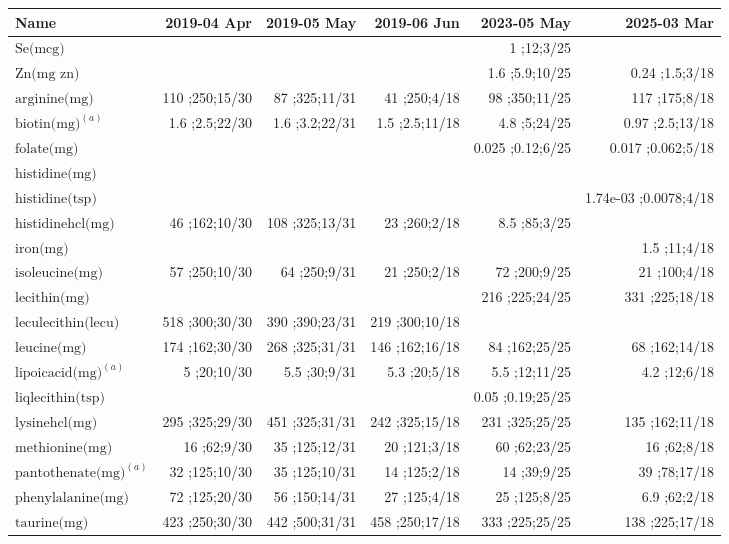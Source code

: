\begin{table}[H]
\centering
\begin{tabular}{|l|r|r|r|r|r|}
\hline
Name&2019-04 Apr&2019-05 May&2019-06 Jun&2023-05 May&2025-03 Mar\\
\hline
$\textrm{Se(mcg)}$&&&&1 ;12;3/25&\\
$\textrm{Zn(mg~zn)}$&&&&1.6 ;5.9;10/25&0.24 ;1.5;3/18\\
$\textrm{arginine(mg)}$&110 ;250;15/30&87 ;325;11/31&41 ;250;4/18&98 ;350;11/25&117 ;175;8/18\\
$\textrm{biotin(mg)}^{\left(a\right)}$&1.6 ;2.5;22/30&1.6 ;3.2;22/31&1.5 ;2.5;11/18&4.8 ;5;24/25&0.97 ;2.5;13/18\\
$\textrm{folate(mg)}$&&&&0.025 ;0.12;6/25&0.017 ;0.062;5/18\\
$\textrm{histidine(mg)}$&&&&&\\
$\textrm{histidine(tsp)}$&&&&&1.74e-03 ;0.0078;4/18\\
$\textrm{histidinehcl(mg)}$&46 ;162;10/30&108 ;325;13/31&23 ;260;2/18&8.5 ;85;3/25&\\
$\textrm{iron(mg)}$&&&&&1.5 ;11;4/18\\
$\textrm{isoleucine(mg)}$&57 ;250;10/30&64 ;250;9/31&21 ;250;2/18&72 ;200;9/25&21 ;100;4/18\\
$\textrm{lecithin(mg)}$&&&&216 ;225;24/25&331 ;225;18/18\\
$\textrm{leculecithin(lecu)}$&518 ;300;30/30&390 ;390;23/31&219 ;300;10/18&&\\
$\textrm{leucine(mg)}$&174 ;162;30/30&268 ;325;31/31&146 ;162;16/18&84 ;162;25/25&68 ;162;14/18\\
$\textrm{lipoicacid(mg)}^{\left(a\right)}$&5 ;20;10/30&5.5 ;30;9/31&5.3 ;20;5/18&5.5 ;12;11/25&4.2 ;12;6/18\\
$\textrm{liqlecithin(tsp)}$&&&&0.05 ;0.19;25/25&\\
$\textrm{lysinehcl(mg)}$&295 ;325;29/30&451 ;325;31/31&242 ;325;15/18&231 ;325;25/25&135 ;162;11/18\\
$\textrm{methionine(mg)}$&16 ;62;9/30&35 ;125;12/31&20 ;121;3/18&60 ;62;23/25&16 ;62;8/18\\
$\textrm{pantothenate(mg)}^{\left(a\right)}$&32 ;125;10/30&35 ;125;10/31&14 ;125;2/18&14 ;39;9/25&39 ;78;17/18\\
$\textrm{phenylalanine(mg)}$&72 ;125;20/30&56 ;150;14/31&27 ;125;4/18&25 ;125;8/25&6.9 ;62;2/18\\
$\textrm{taurine(mg)}$&423 ;250;30/30&442 ;500;31/31&458 ;250;17/18&333 ;225;25/25&138 ;225;17/18\\

\end{tabular}
\end{table}
